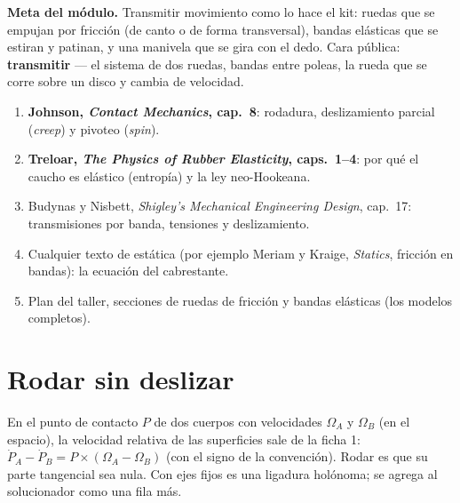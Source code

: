 \documentclass[11pt,a4paper]{article}
\begin{document}
\maketitle
\vspace{-2.5em}

\begin{meta}
\textbf{\textcolor{amarillo}{Meta del módulo.}} Transmitir movimiento como lo hace el kit: ruedas que se empujan por
fricción (de canto o de forma transversal), bandas elásticas que se estiran y patinan, y una manivela que se gira con
el dedo. Cara pública: \textbf{transmitir} — el sistema de dos ruedas, bandas entre poleas, la rueda que se corre
sobre un disco y cambia de velocidad.
\end{meta}

\begin{lectura}
\begin{enumerate}[leftmargin=*]
  \item \textbf{Johnson, \emph{Contact Mechanics}, cap.~8}: rodadura, deslizamiento parcial (\emph{creep}) y
        pivoteo (\emph{spin}).
  \item \textbf{Treloar, \emph{The Physics of Rubber Elasticity}, caps.~1--4}: por qué el caucho es elástico
        (entropía) y la ley neo-Hookeana.
  \item Budynas y Nisbett, \emph{Shigley's Mechanical Engineering Design}, cap.~17: transmisiones por banda,
        tensiones y deslizamiento.
  \item Cualquier texto de estática (por ejemplo Meriam y Kraige, \emph{Statics}, fricción en bandas): la ecuación
        del cabrestante.
  \item Plan del taller, secciones de ruedas de fricción y bandas elásticas (los modelos completos).
\end{enumerate}
\end{lectura}

\section{Rodar sin deslizar}

En el punto de contacto $P$ de dos cuerpos con velocidades $\Omega_A$ y $\Omega_B$ (en el espacio), la velocidad
relativa de las superficies sale de la ficha 1:
$\dot P_A - \dot P_B = P\times(\Omega_A - \Omega_B)$ (con el signo de la convención). Rodar es que su parte tangencial
sea nula. Con ejes fijos es una ligadura holónoma; se agrega al solucionador como una fila más.
\end{document}
